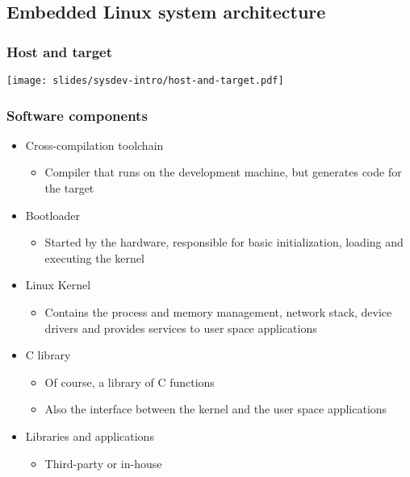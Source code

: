 \subsection{Embedded Linux system architecture}

\begin{frame}
  \frametitle{Host and target}
  \begin{center}
    \texttt{[image: slides/sysdev-intro/host-and-target.pdf]}
  \end{center}
\end{frame}

\begin{frame}
  \frametitle{Software components}
  \begin{itemize}
  \item Cross-compilation toolchain
    \begin{itemize}
    \item Compiler that runs on the development machine, but generates
      code for the target
    \end{itemize}
  \item Bootloader
    \begin{itemize}
    \item Started by the hardware, responsible for basic
      initialization, loading and executing the kernel
    \end{itemize}
  \item Linux Kernel
    \begin{itemize}
    \item Contains the process and memory management, network stack,
      device drivers and provides services to user space applications
    \end{itemize}
  \item C library
    \begin{itemize}
    \item Of course, a library of C functions
    \item Also the interface between the kernel and the user space
      applications
    \end{itemize}
  \item Libraries and applications
    \begin{itemize}
    \item Third-party or in-house
    \end{itemize}
  \end{itemize}
\end{frame}

